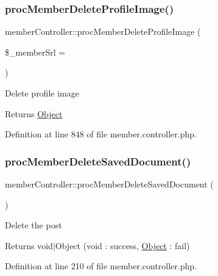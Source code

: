 \subsubsection{\texorpdfstring{proc\+Member\+Delete\+Profile\+Image()}{procMemberDeleteProfileImage()}}
{\footnotesize\ttfamily member\+Controller\+::proc\+Member\+Delete\+Profile\+Image (\begin{DoxyParamCaption}\item[{}]{\$\+\_\+member\+Srl = {} }\end{DoxyParamCaption})}

Delete profile image

\begin{DoxyReturn}{Returns}
\hyperlink{classObject}{Object} 
\end{DoxyReturn}


Definition at line 848 of file member.\+controller.\+php.

\mbox{\label{classmemberController_a4e154a138901b9b941f9949576c47f00}} 
\subsubsection{\texorpdfstring{proc\+Member\+Delete\+Saved\+Document()}{procMemberDeleteSavedDocument()}}
{\footnotesize\ttfamily member\+Controller\+::proc\+Member\+Delete\+Saved\+Document (\begin{DoxyParamCaption}{ }\end{DoxyParamCaption})}

Delete the post

\begin{DoxyReturn}{Returns}
void$\vert$\+Object (void \+: success, \hyperlink{classObject}{Object} \+: fail) 
\end{DoxyReturn}


Definition at line 210 of file member.\+controller.\+php.

\mbox{\label{classmemberController_ae1eb0a3ef4da18d06c4fce0dc4fbbe24}} 
